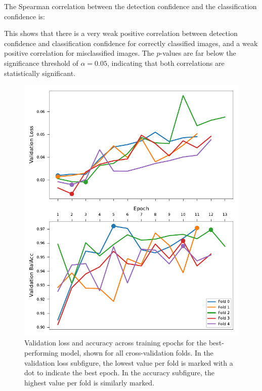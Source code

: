 The Spearman correlation between the detection confidence and the classification confidence is:



This shows that there is a very weak positive correlation between detection confidence and classification confidence for correctly classified images, and a weak positive correlation for misclassified images.
The $p$-values are far below the significance threshold of \( \alpha = 0.05 \), indicating that both correlations are statistically significant.

\begin{figure}[ht]
\centering
\includegraphics{figures/training_metrics_best_model.pdf}
\caption{Validation loss and accuracy across training epochs for the best-performing model, shown for all cross-validation folds. In the validation loss subfigure, the lowest value per fold is marked with a dot to indicate the best epoch. In the accuracy subfigure, the highest value per fold is similarly marked.}
\label{fig:training_metrics_best_model}
\end{figure}

